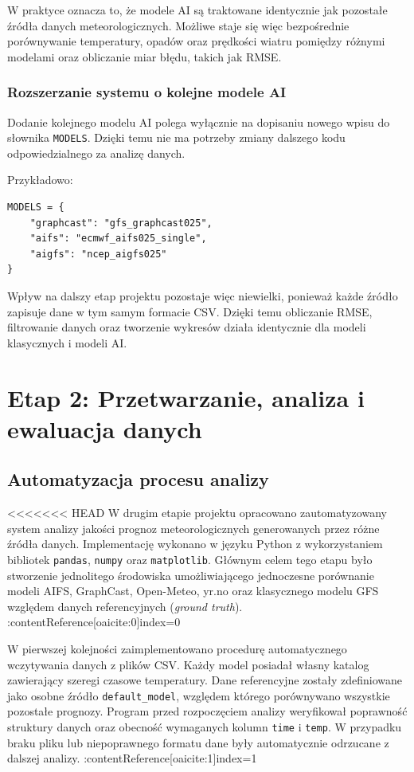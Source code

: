\documentclass[a4paper,12pt]{article}
\begin{document}
\noindent
W praktyce oznacza to, że modele AI są traktowane identycznie jak pozostałe
źródła danych meteorologicznych. Możliwe staje się więc bezpośrednie
porównywanie temperatury, opadów oraz prędkości wiatru pomiędzy różnymi
modelami oraz obliczanie miar błędu, takich jak RMSE.

\subsubsection{Rozszerzanie systemu o kolejne modele AI}

Dodanie kolejnego modelu AI polega wyłącznie na dopisaniu nowego wpisu
do słownika \texttt{MODELS}. Dzięki temu nie ma potrzeby zmiany dalszego
kodu odpowiedzialnego za analizę danych.

\noindent
Przykładowo:
\begin{verbatim}
MODELS = {
    "graphcast": "gfs_graphcast025",
    "aifs": "ecmwf_aifs025_single",
    "aigfs": "ncep_aigfs025"
}
\end{verbatim}

\noindent
Wpływ na dalszy etap projektu pozostaje więc niewielki, ponieważ każde
źródło zapisuje dane w tym samym formacie CSV. Dzięki temu obliczanie
RMSE, filtrowanie danych oraz tworzenie wykresów działa identycznie dla
modeli klasycznych i modeli AI.

\newpage


\section{Etap 2: Przetwarzanie, analiza i ewaluacja danych}

\subsection{Automatyzacja procesu analizy}

<<<<<<< HEAD
W drugim etapie projektu opracowano zautomatyzowany system analizy jakości prognoz meteorologicznych generowanych przez różne źródła danych. Implementację wykonano w języku Python z wykorzystaniem bibliotek \texttt{pandas}, \texttt{numpy} oraz \texttt{matplotlib}. Głównym celem tego etapu było stworzenie jednolitego środowiska umożliwiającego jednoczesne porównanie modeli AIFS, GraphCast, Open-Meteo, yr.no oraz klasycznego modelu GFS względem danych referencyjnych (\textit{ground truth}). :contentReference[oaicite:0]{index=0}

W pierwszej kolejności zaimplementowano procedurę automatycznego wczytywania danych z plików CSV. Każdy model posiadał własny katalog zawierający szeregi czasowe temperatury. Dane referencyjne zostały zdefiniowane jako osobne źródło \texttt{default\_model}, względem którego porównywano wszystkie pozostałe prognozy. Program przed rozpoczęciem analizy weryfikował poprawność struktury danych oraz obecność wymaganych kolumn \texttt{time} i \texttt{temp}. W przypadku braku pliku lub niepoprawnego formatu dane były automatycznie odrzucane z dalszej analizy. :contentReference[oaicite:1]{index=1}
\end{document}
